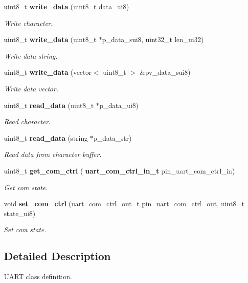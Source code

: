 \begin{DoxyCompactItemize}
uint8\+\_\+t \textbf{ write\+\_\+data} (uint8\+\_\+t data\+\_\+ui8)
\begin{DoxyCompactList}\small\item\em Write character. \end{DoxyCompactList}\item 
uint8\+\_\+t \textbf{ write\+\_\+data} (uint8\+\_\+t $\ast$p\+\_\+data\+\_\+sui8, uint32\+\_\+t len\+\_\+ui32)
\begin{DoxyCompactList}\small\item\em Write data string. \end{DoxyCompactList}\item 
uint8\+\_\+t \textbf{ write\+\_\+data} (vector$<$ uint8\+\_\+t $>$ \&pv\+\_\+data\+\_\+sui8)
\begin{DoxyCompactList}\small\item\em Write data vector. \end{DoxyCompactList}\item 
uint8\+\_\+t \textbf{ read\+\_\+data} (uint8\+\_\+t $\ast$p\+\_\+data\+\_\+ui8)
\begin{DoxyCompactList}\small\item\em Read character. \end{DoxyCompactList}\item 
uint8\+\_\+t \textbf{ read\+\_\+data} (string $\ast$p\+\_\+data\+\_\+str)
\begin{DoxyCompactList}\small\item\em Read data from character buffer. \end{DoxyCompactList}\item 
uint8\+\_\+t \textbf{ get\+\_\+com\+\_\+ctrl} (\textbf{ uart\+\_\+com\+\_\+ctrl\+\_\+in\+\_\+t} pin\+\_\+uart\+\_\+com\+\_\+ctrl\+\_\+in)
\begin{DoxyCompactList}\small\item\em Get com state. \end{DoxyCompactList}\item 
void \textbf{ set\+\_\+com\+\_\+ctrl} (uart\+\_\+com\+\_\+ctrl\+\_\+out\+\_\+t pin\+\_\+uart\+\_\+com\+\_\+ctrl\+\_\+out, uint8\+\_\+t state\+\_\+ui8)
\begin{DoxyCompactList}\small\item\em Set com state. \end{DoxyCompactList}\end{DoxyCompactItemize}


\subsection{Detailed Description}
U\+A\+RT class definition. 

